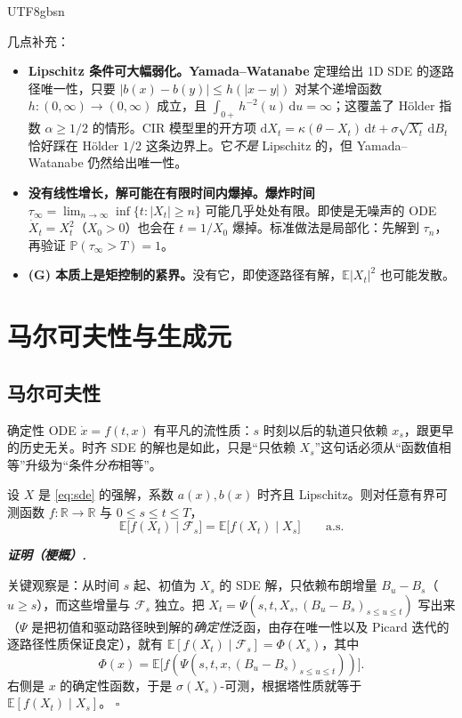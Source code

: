 \documentclass{article}
\newenvironment{proof}[1][证明]{%
  \par\smallskip\noindent\textit{\textbf{#1.}}\quad\ignorespaces
}{%
  \hfill$\square$\par\smallskip
}
\theoremstyle{plain}
\theoremstyle{definition}
\begin{document}
\begin{CJK*}{UTF8}{gbsn}
\medskip

几点补充：

\begin{itemize}
    \item \textbf{Lipschitz 条件可大幅弱化。}\textbf{Yamada--Watanabe} 定理给出 1D SDE 的逐路径唯一性，只要 $|b(x)-b(y)|\le h(|x-y|)$ 对某个递增函数 $h:(0,\infty)\to(0,\infty)$ 成立，且 $\int_{0+}h^{-2}(u)\,\mathrm{d}u=\infty$；这覆盖了 H\"older 指数 $\alpha\ge 1/2$ 的情形。CIR 模型里的开方项 $\mathrm{d}X_t=\kappa(\theta-X_t)\,\mathrm{d}t+\sigma\sqrt{X_t}\,\mathrm{d}B_t$ 恰好踩在 H\"older $1/2$ 这条边界上。它\emph{不是} Lipschitz 的，但 Yamada--Watanabe 仍然给出唯一性。
    \item \textbf{没有线性增长，解可能在有限时间内爆掉。}\textbf{爆炸时间}
    $\tau_\infty=\lim_{n\to\infty}\inf\{t:|X_t|\ge n\}$
    可能几乎处处有限。即使是无噪声的 ODE $\dot X_t=X_t^2$（$X_0>0$）也会在 $t=1/X_0$ 爆掉。标准做法是局部化：先解到 $\tau_n$，再验证 $\mathbb{P}(\tau_\infty>T)=1$。
    \item \textbf{(G) 本质上是矩控制的紧界。}没有它，即使逐路径有解，$\mathbb{E}|X_t|^2$ 也可能发散。
\end{itemize}

\section{马尔可夫性与生成元}

\subsection{马尔可夫性}

确定性 ODE $\dot x=f(t,x)$ 有平凡的流性质：$s$ 时刻以后的轨道只依赖 $x_s$，跟更早的历史无关。时齐 SDE 的解也是如此，只是“只依赖 $X_s$”这句话必须从“函数值相等”升级为“条件\emph{分布}相等”。

\begin{theorem}[马尔可夫性]\label{thm:markov}
设 $X$ 是 \eqref{eq:sde} 的强解，系数 $a(x),b(x)$ 时齐且 Lipschitz。则对任意有界可测函数 $f:\mathbb{R}\to\mathbb{R}$ 与 $0\le s\le t\le T$，
\[
  \mathbb{E}\bigl[f(X_t)\mid \mathcal{F}_s\bigr]=\mathbb{E}\bigl[f(X_t)\mid X_s\bigr]\qquad\text{a.s.}
\]
\end{theorem}

\begin{proof}[证明（梗概）]
关键观察是：从时间 $s$ 起、初值为 $X_s$ 的 SDE 解，只依赖布朗增量 $B_u-B_s$（$u\ge s$），而这些增量与 $\mathcal{F}_s$ 独立。把 $X_t=\Psi(s,t,X_s,(B_u-B_s)_{s\le u\le t})$ 写出来（$\Psi$ 是把初值和驱动路径映到解的\emph{确定性}泛函，由存在唯一性以及 Picard 迭代的逐路径性质保证良定），就有 $\mathbb{E}[f(X_t)\mid\mathcal{F}_s]=\Phi(X_s)$，其中
\[
  \Phi(x)=\mathbb{E}\bigl[f(\Psi(s,t,x,(B_u-B_s)_{s\le u\le t}))\bigr].
\]
右侧是 $x$ 的确定性函数，于是 $\sigma(X_s)$-可测，根据塔性质就等于 $\mathbb{E}[f(X_t)\mid X_s]$。
\end{proof}


\end{CJK*}
\end{document}
